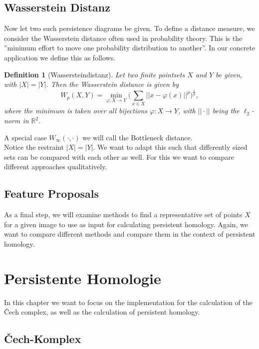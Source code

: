 \documentclass[11pt, a4paper,draft]{report}
\newtheorem{definition}{Definition}
\newcommand{\bR}{\mathbb{R}}
\begin{document}
	\section{Wasserstein Distanz}
	
	Now let two such persistence diagrams be given. To define a distance measure, we consider the Wasserstein distance often used in probability theory. This is the ''minimum effort to move one probability distribution to another''. In our concrete application we define this as follows.
	
	\begin{definition}[Wassersteindistanz]
		Let two finite pointsets $X$ and $Y$ be given, with $|X|=|Y|$. Then the Wasserstein distance is given by$$W_p(X,Y) = \min_{\varphi:X\rightarrow Y}\bigg(\sum_{x\in X}||x-\varphi(x)||^p\bigg)^{\frac{1}{p}},$$
		where the minimum is taken over all bijections $\varphi:X\rightarrow Y$, with $||\cdot||$ being the $\ell_2$-norm in $\bR^2$.
	\end{definition}

	A special case $W_\infty(\cdot,\cdot)$ we will call the Bottleneck distance.\\
Notice the restraint $|X| = |Y|$. We want to adapt this such that differently sized sets can be compared with each other as well. For this we want to compare different approaches qualitatively.
	
	\section{Feature Proposals}
	
	As a final step, we will examine methods to find a representative set of points $X$ for a given image to use as input for calculating persistent homology. Again, we want to compare different methods and compare them in the context of persistent homology.
	\chapter{Persistente Homologie}
	
	In this chapter we want to focus on the implementation for the calculation of the Čech complex, as well as the calculation of persistent homology.
	
	\section{Čech-Komplex}
	
\end{document}
